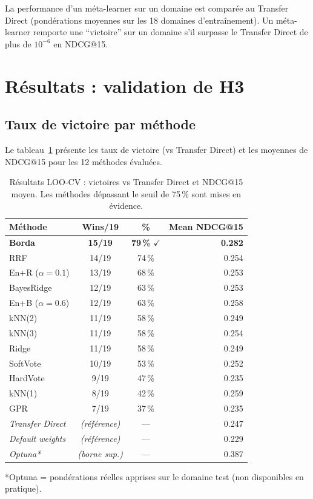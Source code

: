 La performance d'un méta-learner sur un domaine est comparée au Transfer
Direct (pondérations moyennes sur les 18 domaines d'entraînement).
Un méta-learner remporte une ``victoire'' sur un domaine s'il surpasse
le Transfer Direct de plus de $10^{-6}$ en NDCG@15.

\section{Résultats : validation de H3}
\label{sec:h3_results}

\subsection{Taux de victoire par méthode}

Le tableau~\ref{tab:loo_results} présente les taux de victoire (vs Transfer
Direct) et les moyennes de NDCG@15 pour les 12 méthodes évaluées.

\begin{table}[htbp]
  \centering
  \caption{Résultats LOO-CV : victoires vs Transfer Direct et NDCG@15 moyen.
  Les méthodes dépassant le seuil de 75\,\% sont mises en évidence.}
  \label{tab:loo_results}
  \begin{tabular}{lccr}
    \toprule
    \textbf{Méthode} & \textbf{Wins/19} & \textbf{\%} & \textbf{Mean NDCG@15} \\
    \midrule
    \rowcolor{green!20}
    \textbf{Borda} & \textbf{15/19} & \textbf{79\,\%} $\checkmark$ & \textbf{0.282} \\
    RRF & 14/19 & 74\,\% & 0.254 \\
    En+R ($\alpha = 0.1$) & 13/19 & 68\,\% & 0.253 \\
    BayesRidge & 12/19 & 63\,\% & 0.253 \\
    En+B ($\alpha = 0.6$) & 12/19 & 63\,\% & 0.258 \\
    kNN(2) & 11/19 & 58\,\% & 0.249 \\
    kNN(3) & 11/19 & 58\,\% & 0.254 \\
    Ridge & 11/19 & 58\,\% & 0.249 \\
    SoftVote & 10/19 & 53\,\% & 0.252 \\
    HardVote & 9/19 & 47\,\% & 0.235 \\
    kNN(1) & 8/19 & 42\,\% & 0.259 \\
    GPR & 7/19 & 37\,\% & 0.235 \\
    \midrule
    \textit{Transfer Direct} & \textit{(référence)} & — & 0.247 \\
    \textit{Default weights} & \textit{(référence)} & — & 0.229 \\
    \textit{Optuna*} & \textit{(borne sup.)} & — & 0.387 \\
    \bottomrule
  \end{tabular}
  \small{*Optuna = pondérations réelles apprises sur le domaine test (non disponibles en pratique).}
\end{table}

